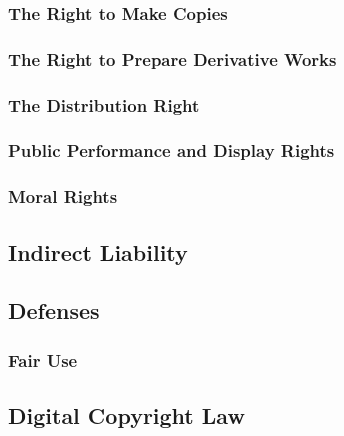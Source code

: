 
\subsubsection{The Right to Make Copies}


\subsubsection{The Right to Prepare Derivative Works}


\subsubsection{The Distribution Right}


\subsubsection{Public Performance and Display Rights}


\subsubsection{Moral Rights}


\subsection{Indirect Liability}


\subsection{Defenses}


\subsubsection{Fair Use}



\subsection{Digital Copyright Law}

